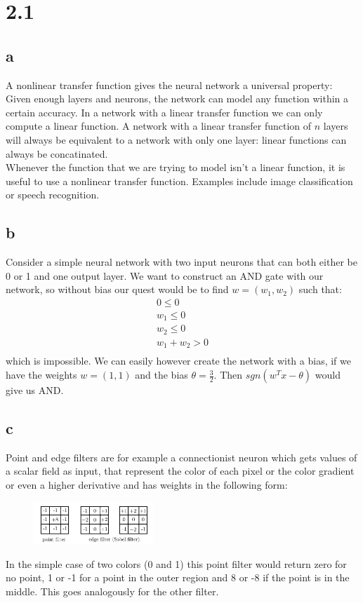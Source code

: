 \documentclass[11pt,a4paper]{article}
\begin{document}
\section*{2.1}
\subsection*{a}
A nonlinear transfer function gives the neural network a universal property: Given enough layers and neurons, the network can model any function within a certain accuracy. In a network with a linear transfer function we can only compute a linear function. A network with a linear transfer function of $n$ layers will always be equivalent to a network with only one layer: linear functions can always be concatinated.\\
Whenever the function that we are trying to model isn't a linear function, it is useful to use a nonlinear transfer function.
Examples include image classification or speech recognition.
\subsection*{b}
Consider a simple neural network with two input neurons that can both either be 0 or 1 and one output layer. We want to construct an AND gate with our network, so without bias our quest would be to find $w = (w_1, w_2)$ such that:
\begin{align*}
  0 \leq 0\\
  w_1 \leq 0\\
  w_2 \leq 0\\
  w_1 + w_2 > 0\\
\end{align*}
which is impossible. We can easily however create the network with a bias, if we have the weights $w = (1, 1)$ and the bias
$\theta = \frac{3}{2}$. Then $sgn(w^Tx - \theta)$ would give us AND.
\subsection*{c}
Point and edge filters are for example a connectionist neuron which gets values of a scalar field as input, that
represent the color of each pixel or the color gradient or even a higher derivative and has weights in the following form:
\begin{figure}[h]
\centering
 \includegraphics[width=0.4\textwidth]{./point_edge.png}
\end{figure}
In the simple case of two colors (0 and 1) this point filter would return zero for no point, 1 or -1 for a point in the outer
region and 8 or -8 if the point is in the middle. This goes analogously for the other filter.
\end{document}
